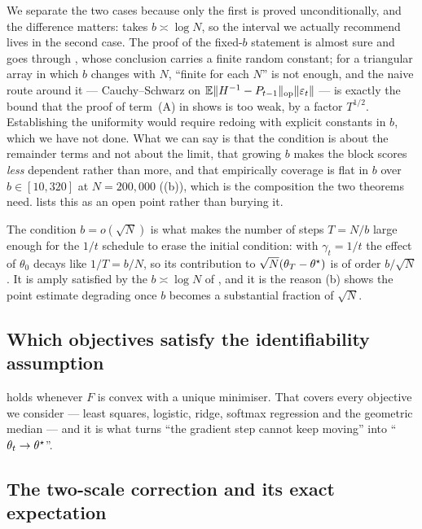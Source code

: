We separate the two cases because only the first is proved unconditionally, and the difference
matters:  takes $b\asymp\log N$, so the interval we actually recommend lives in the
second case. The proof of the fixed-$b$ statement is almost sure and goes through
, whose conclusion carries a finite random constant; for a triangular array in
which $b$ changes with $N$, ``finite for each $N$'' is not enough, and the naive route around it
--- Cauchy--Schwarz on $\mathbb{E}\lVert H^{-1}-P_{t-1} \rVert_{\mathrm{op}}\lVert \varepsilon_t \rVert$ --- is exactly the bound that the
proof of term~(A) in  shows is too weak, by a factor $T^{1/2}$. Establishing the uniformity would
require redoing  with explicit constants in $b$, which we have not done. What we
can say is that the condition is about the remainder terms and not about the limit, that growing
$b$ makes the block scores \emph{less} dependent rather than more, and that empirically coverage
is flat in $b$ over $b\in[10,320]$ at $N=200{,}000$ ((b)), which is the
composition the two theorems need.  lists this as an open point rather than
burying it.

The condition $b=o(\sqrt N)$ is what makes the number of steps $T=N/b$ large enough for the
$1/t$ schedule to erase the initial condition: with $\gamma_t=1/t$ the effect of $\theta_0$
decays like $1/T=b/N$, so its contribution to $\sqrt N(\theta_T-\theta^\star)$ is of order
$b/\sqrt N$. It is amply satisfied by the $b\asymp\log N$ of , and it is the
reason (b) shows the point estimate degrading once $b$ becomes a
substantial fraction of $\sqrt N$.

\subsection{Which objectives satisfy the identifiability assumption}
\label{app:asdisc}

 holds whenever $F$ is convex with a unique minimiser. That covers every objective we
consider --- least squares, logistic, ridge, softmax regression and the geometric median --- and it
is what turns ``the gradient step cannot keep moving'' into ``$\theta_t\to\theta^\star$''.

\subsection{The two-scale correction and its exact expectation}
\label{app:flattop}

